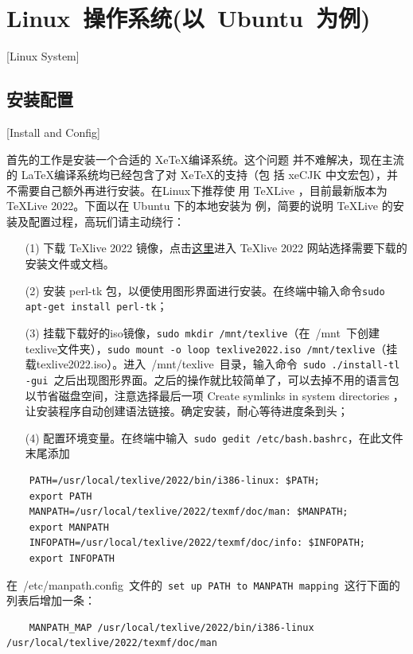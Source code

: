 \section{Linux~操作系统(以~Ubuntu~为例)}[Linux System]

\subsection{安装配置}[Install and Config]

首先的工作是安装一个合适的 Xe\TeX{}编译系统。这个问题
并不难解决，现在主流的 \LaTeX{}编译系统均已经包含了对 Xe\TeX{}的支持（包
括 xeCJK 中文宏包），并不需要自己额外再进行安装。在Linux下推荐使
用 \TeX{}Live ，目前最新版本为 \TeX{}Live 2022。下面以在 Ubuntu 下的本地安装为
例，简要的说明 \TeX{}Live 的安装及配置过程，高玩们请主动绕行：

\begin{enumerate}
  \item[(1)] 下载 \TeX{}live 2022 镜像，点击\href{https://tug.org/texlive/}{这里}进入 \TeX{}live 2022 网站选择需要下载的安装文件或文档。
  \item[(2)] 安装 perl-tk 包，以便使用图形界面进行安装。在终端中输入命令\texttt{sudo apt-get install perl-tk}；
  \item[(3)] 挂载下载好的iso镜像，\texttt{sudo mkdir /mnt/texlive}（在~{/mnt}~下创建texlive文件夹），\texttt{sudo mount -o loop texlive2022.iso  /mnt/texlive}（挂载texlive2022.iso）。进入~/mnt/texlive~目录，输入命令~\texttt{sudo ./install-tl -gui}~之后出现图形界面。之后的操作就比较简单了，可以去掉不用的语言包以节省磁盘空间，注意选择最后一项 Create symlinks in system directories ，让安装程序自动创建语法链接。确定安装，耐心等待进度条到头；
  \item[(4)] 配置环境变量。在终端中输入~\texttt{sudo gedit /etc/bash.bashrc}，在此文件末尾添加
\end{enumerate}

\begin{lstlisting}
    PATH=/usr/local/texlive/2022/bin/i386-linux: $PATH;
    export PATH
    MANPATH=/usr/local/texlive/2022/texmf/doc/man: $MANPATH;
    export MANPATH
    INFOPATH=/usr/local/texlive/2022/texmf/doc/info: $INFOPATH;
    export INFOPATH
\end{lstlisting}

在~{/etc/manpath.config}~文件的~\texttt{set up PATH to  MANPATH mapping}~这行下面的列表后增加一条：

\begin{lstlisting}
    MANPATH_MAP /usr/local/texlive/2022/bin/i386-linux  /usr/local/texlive/2022/texmf/doc/man
\end{lstlisting}

